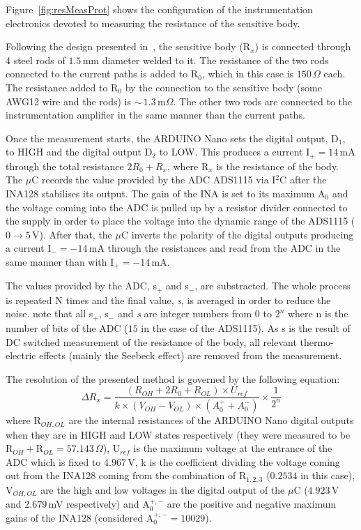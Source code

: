 \documentclass[journal,twoside,web]{ieeecolor}
\begin{document}
Figure~\ref{fig:resMeasProt} shows the configuration of the instrumentation electronics devoted to measuring the resistance of the sensitive body.

Following the design presented in~\cite{bengtsson2012}, the sensitive body (R$_{x}$) is connected through 4 steel rods of $1.5$\,mm diameter welded to it. The resistance of the two rods connected to the current paths is added to R$_{0}$, which in this case is $150$\,$\Omega$ each. The resistance added to R$_{0}$ by the connection to the sensitive body (some AWG12 wire and the rods) is $\sim$\,$1.3$\,m$\Omega$. The other two rods are connected to the instrumentation amplifier in the same manner than the current paths.

Once the measurement starts, the ARDUINO Nano sets the digital output, D$_{1}$, to HIGH and the digital output D$_{2}$ to LOW. This produces a current I$_{+}=14$\,mA through the total resistance $2R_{0}+R_{x}$, where R$_{x}$ is the resistance of the body. The $\mu$C records the value provided by the ADC ADS1115 via I$^{2}$C after the INA128 stabilises its output. The gain of the INA is set to its maximum A$_{0}$ and the voltage coming into the ADC is pulled up by a resistor divider connected to the supply in order to place the voltage into the dynamic range of the ADS1115 ($0\rightarrow5$\,V). After that, the $\mu$C inverts the polarity of the digital outputs producing a current I$_{-}=-14$\,mA through the resistances and read from the ADC in the same manner than with I$_{+}=-14$\,mA.

The values provided by the ADC, s$_{+}$ and s$_{-}$, are substracted. The whole process is repeated N times and the final value, \textit{s}, is averaged in order to reduce the noise. note that all s$_{+}$, s$_{-}$ and \textit{s} are integer numbers from $0$ to $2^{n}$ where n is the number of bits of the ADC ($15$ in the case of the ADS1115). As s is the result of DC switched measurement of the resistance of the body, all relevant thermo-electric effects (mainly the Seebeck effect) are removed from the measurement. 

The resolution of the presented method is governed by the following equation:
\begin{equation}
\label{eq:resRx}
\Delta R_{x} = \frac{\left( R_{OH}+2R_{0}+R_{OL}\right)\times U_{ref}}{k\times\left( V_{OH}-V_{OL}\right)\times \left(A^{+}_{0}+A^{-}_{0}\right)}\times\frac{1}{2^{n}}
\end{equation}
where R$_{OH, OL}$ are the internal resistances of the ARDUINO Nano digital outputs when they are in HIGH and LOW states respectively (they were measured to be R$_{OH}+$R$_{OL}=57.143$\,$\Omega$), U$_{ref}$ is the maximum voltage at the entrance of the ADC which is fixed to $4.967$\,V, k is the coefficient dividing the voltage coming out from the INA128 coming from the combination of R$_{1, 2, 3}$ ($0.2534$ in this case), V$_{OH, OL}$ are the high and low voltages in the digital output of the $\mu$C ($4.923$\,V and $2.679$\,mV respectively) and A$^{+,-}_{0}$ are the positive and negative maximum gains of the INA128 (considered A$^{+,-}_{0}=10029$).
\end{document}
